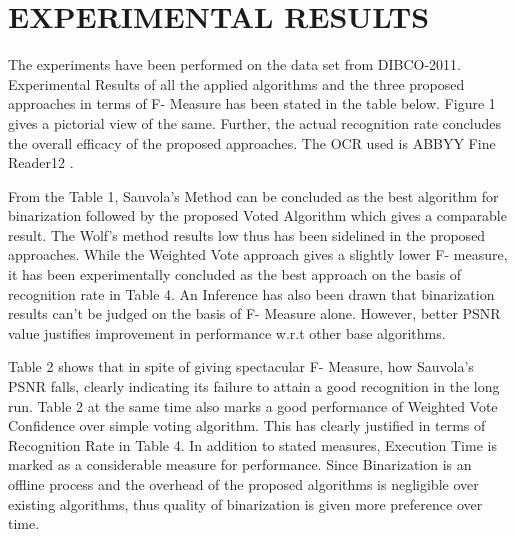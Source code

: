 \documentclass[conference]{IEEEtran}
\begin{document}
\section{EXPERIMENTAL RESULTS}
The experiments have been performed on the data set from DIBCO-2011\cite{dibco2011dataset}. Experimental Results of all the applied algorithms and the three proposed approaches in terms of F- Measure has been stated in the table below. Figure 1 gives a pictorial view of the same. Further, the actual recognition rate concludes the overall efficacy of the proposed approaches. The OCR used is ABBYY Fine Reader12 \cite{abbyy}.

From the Table 1, Sauvola's Method can be concluded as the best algorithm for binarization followed by the proposed Voted Algorithm which gives a comparable result. The Wolf's method results low thus has been sidelined in the proposed approaches. While the Weighted Vote approach gives a slightly lower F- measure, it has been experimentally concluded as the best approach on the basis of recognition rate in Table 4. An Inference has also been drawn that binarization results can't be judged on the basis of F- Measure alone. However, better PSNR value justifies improvement in performance w.r.t other base algorithms.

Table 2 shows that in spite of giving spectacular F- Measure, how Sauvola's PSNR falls, clearly indicating its failure to attain a good recognition in the long run. Table 2 at the same time also marks a good performance of Weighted Vote Confidence over simple voting algorithm. This has clearly justified in terms of Recognition Rate in Table 4. In addition to stated measures, Execution Time is marked as a considerable measure for performance. Since Binarization is an offline process and the overhead of the proposed algorithms is negligible over existing algorithms, thus quality of binarization is given more preference over time.
\end{document}
